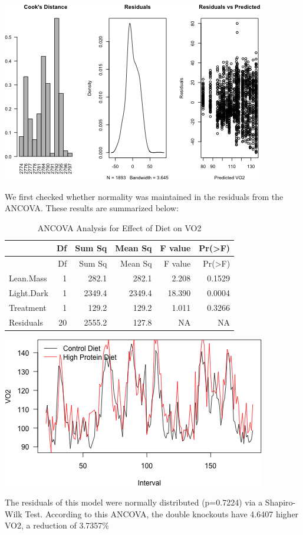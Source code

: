 \documentclass[]{article}
\begin{document}
\includegraphics{figures/vo2-diagnostic-plots-1.png}

We first checked whether normality was maintained in the residuals from
the ANCOVA. These results are summarized below:

\begin{longtable}[c]{@{}lrrrrr@{}}
\caption{ANCOVA Analysis for Effect of Diet on VO2}\tabularnewline
\toprule
& Df & Sum Sq & Mean Sq & F value & Pr(\textgreater{}F)\tabularnewline
\midrule
\endfirsthead
\toprule
& Df & Sum Sq & Mean Sq & F value & Pr(\textgreater{}F)\tabularnewline
\midrule
\endhead
Lean.Mass & 1 & 282.1 & 282.1 & 2.208 & 0.1529\tabularnewline
Light.Dark & 1 & 2349.4 & 2349.4 & 18.390 & 0.0004\tabularnewline
Treatment & 1 & 129.2 & 129.2 & 1.011 & 0.3266\tabularnewline
Residuals & 20 & 2555.2 & 127.8 & NA & NA\tabularnewline
\bottomrule
\end{longtable}

\includegraphics{figures/vo2-time-course-1.png}

The residuals of this model were normally distributed (p=0.7224) via a
Shapiro-Wilk Test. According to this ANCOVA, the double knockouts have
4.6407 higher VO2, a reduction of 3.7357\%
\end{document}
